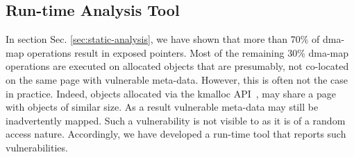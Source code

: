 \subsection{Run-time Analysis Tool}\label{sec:dma-kasan} 

In section Sec. \ref{sec:static-analysis}, we have shown that more than 70\% of dma-map operations result in exposed pointers. 
Most of the remaining 30\% dma-map operations are executed on allocated objects that are presumably, not co-located on the same page with vulnerable meta-data. However, this is often not the case in practice.
Indeed, objects allocated via the kmalloc API~\cite{Cor07}, may share a page with objects of similar size. As a result vulnerable meta-data may still be inadvertently mapped. 
%
Such a vulnerability is not visible to \tool as it is of a random access nature. Accordingly, we have developed a run-time tool that reports such vulnerabilities. 

